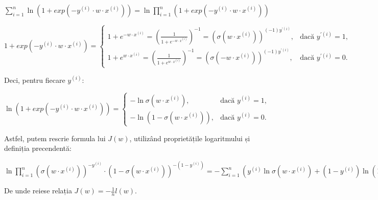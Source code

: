\documentclass{article}
\begin{document}
\( \sum_{i=1}^{n} \ln (1 + exp(-y^{(i)} \cdot w \cdot x^{(i)})) = \ln \prod_{i=1}^{n} (1 + exp(-y^{(i)} \cdot w \cdot x^{(i)})) \)

\( 1 + exp(-y^{(i)} \cdot w \cdot x^{(i)}) = \begin{cases}
1 + e^{-w \cdot x^{(i)}} = (\frac{1}{1 + e^{-w \cdot x^{(i)}}})^{-1} = (\sigma (w \cdot x^{(i)}))^{(-1)y^{'(i)}}, & \text{dacă } y^{'(i)} = 1, \\
1 + e^{w \cdot x^{(i)}} = (\frac{1}{1 + e^{w \cdot x^{(i)}}})^{-1} = (\sigma (-w \cdot x^{(i)}))^{(-1)y^{'(i)}}, & \text{dacă } y^{'(i)} = 0.
\end{cases} \)

Deci, pentru fiecare \( y^{(i)} \):

\( \ln (1 + exp(-y^{(i)} \cdot w \cdot x^{(i)})) = \begin{cases}
-\ln \sigma (w \cdot x^{(i)}), & \text{dacă } y^{(i)} = 1, \\
-\ln (1 - \sigma (w \cdot x^{(i)})), & \text{dacă } y^{(i)} = 0.
\end{cases} \)

Astfel, putem rescrie formula lui \( J(w) \), utilizând proprietățile logaritmului și definiția precendentă:

\( \ln \prod_{i=1}^{n} (\sigma (w \cdot x^{(i)}))^{-y^{(i)}} \cdot (1 - \sigma (w \cdot x^{(i)}))^{-(1-y^{(i)})} = -\sum_{i=1}^{n} (y^{(i)} \ln \sigma (w \cdot x^{(i)}) + (1 - y^{(i)}) \ln (1 - \sigma (w \cdot x^{(i)}))) \)

De unde reiese relația \( J(w) = -\frac{1}{n} l(w) \).
\end{document}
